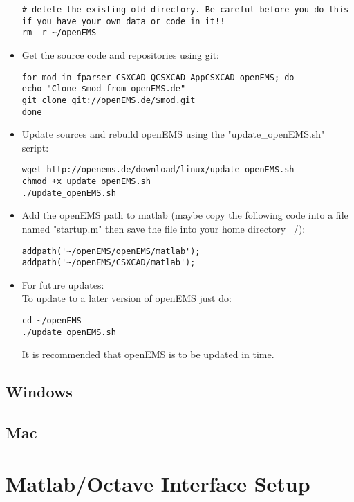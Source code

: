 \begin{itemize}
      \begin{lstlisting}[style=shell]
# delete the existing old directory. Be careful before you do this if you have your own data or code in it!!
rm -r ~/openEMS
      \end{lstlisting}
    \item Get the source code and repositories using git:
      \begin{lstlisting}[style=shell]
for mod in fparser CSXCAD QCSXCAD AppCSXCAD openEMS; do
echo "Clone $mod from openEMS.de"
git clone git://openEMS.de/$mod.git
done
      \end{lstlisting}
    \item Update sources and rebuild openEMS using the "update\_openEMS.sh" script:
      \begin{lstlisting}[style=shell]
wget http://openems.de/download/linux/update_openEMS.sh
chmod +x update_openEMS.sh
./update_openEMS.sh       
      \end{lstlisting}

   \item  Add the openEMS path to matlab (maybe copy the following code into a  file named "startup.m" then save the file into your home directory ~/):
      \begin{lstlisting}
addpath('~/openEMS/openEMS/matlab');
addpath('~/openEMS/CSXCAD/matlab');
      \end{lstlisting}
    \item For future updates:\\
	To update to a later version of openEMS just do:
	\begin{lstlisting}
cd ~/openEMS
./update_openEMS.sh
	\end{lstlisting}  
It is recommended that openEMS is to be updated  in time.
\end{itemize}

\subsection{Windows}

\subsection{Mac}

\section{Matlab/Octave Interface Setup}

